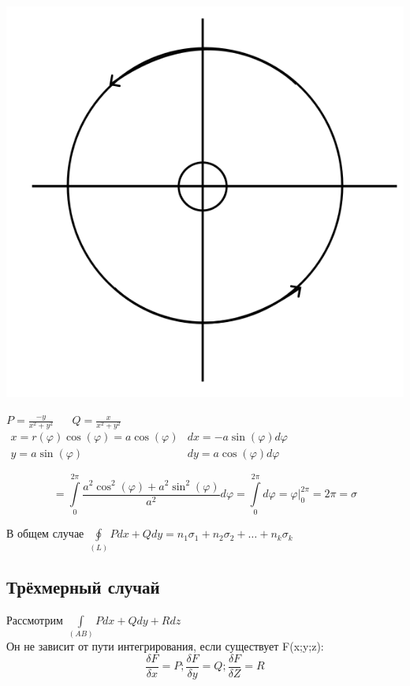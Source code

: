 \documentclass[12pt]{article}
\let\ORIincludegraphics\includegraphics
\renewcommand{\includegraphics}[2][]{\ORIincludegraphics[scale=0.65,#1]{#2}}
\let\oldint\int
\let\oldoint\oint
\renewcommand{\int}{\oldint\limits}
\renewcommand{\oint}{\oldoint\limits}
\begin{document}
  \begin{minipage}{0.2\textwidth}
    \includegraphics[scale=0.4]{8.8.6.png}
  \end{minipage}
  \hspace{1em}
  \begin{minipage}{0.8\textwidth}
    $P=\frac{-y}{x^2+y^2} \hspace{20pt} Q=\frac{x}{x^2+y^2} \hspace{10pt}$
    $\begin{matrix}
      x=r(\varphi)\cos(\varphi)=a\cos(\varphi) & dx=-a\sin(\varphi)d\varphi\\
      y=a\sin(\varphi) & dy=a\cos(\varphi)d\varphi
    \end{matrix}$
  \end{minipage}
  \vspace{1em}
  \par
  \[\boxed{=} \int_{0}^{2\pi} \frac{a^2\cos^2(\varphi)+a^2\sin^2(\varphi)}{a^2}d\varphi = 
  \int_{0}^{2\pi}d\varphi=\varphi \Big|^{2\pi}_0 = 2\pi = \sigma\]
  \begin{center}
    В общем случае $\oint_{(L)} Pdx+Qdy=n_1\sigma_1+n_2\sigma_2+\dots+n_k\sigma_k$
  \end{center}
  \subsection{Трёхмерный случай}
  Рассмотрим $\int_{(AB)}Pdx+Qdy+Rdz$\\
  Он не зависит от пути интегрирования, если существует F(x;y;z):
  \[\frac{\delta F}{\delta x}=P;\frac{\delta F}{\delta y}=Q;\frac{\delta F}{\delta Z}=R\]
\end{document}
